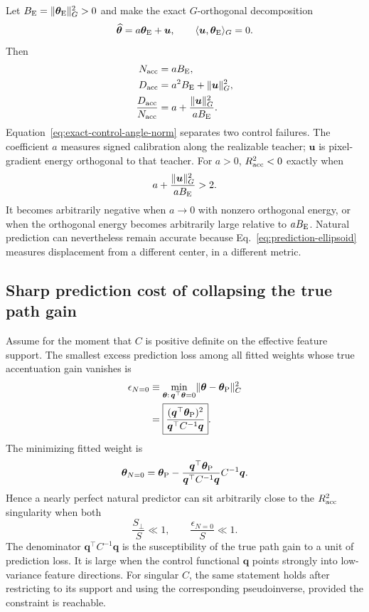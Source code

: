 \documentclass[11pt]{article}
\newcommand{\that}{\widehat{\bm\theta}}
\begin{document}
Let $B_{\rm E}=\lVert\bm\theta_{\rm E}\rVert_G^2>0$ and make the exact
$G$-orthogonal decomposition
\begin{equation}
  \that=a\bm\theta_{\rm E}+\bm u,
  \qquad
  \langle\bm u,\bm\theta_{\rm E}\rangle_G=0.
\end{equation}
Then
\begin{align}
  N_{\rm acc}&=aB_{\rm E},\\
  D_{\rm acc}&=a^2B_{\rm E}+\lVert\bm u\rVert_G^2,\\
  \frac{D_{\rm acc}}{N_{\rm acc}}
    &=a+\frac{\lVert\bm u\rVert_G^2}{aB_{\rm E}}.
  \label{eq:exact-control-angle-norm}
\end{align}
Equation~\eqref{eq:exact-control-angle-norm} separates two control failures.
The coefficient $a$ measures signed calibration along the realizable teacher;
$\bm u$ is pixel-gradient energy orthogonal to that teacher.  For $a>0$,
$R^2_{\rm acc}<0$ exactly when
\begin{equation}
  a+\frac{\lVert\bm u\rVert_G^2}{aB_{\rm E}}>2.
\end{equation}
It becomes arbitrarily negative when $a\to0$ with nonzero orthogonal energy,
or when the orthogonal energy becomes arbitrarily large relative to
$aB_{\rm E}$.  Natural prediction can nevertheless remain accurate because
Eq.~\eqref{eq:prediction-ellipsoid} measures displacement from a different
center, in a different metric.

\subsection{Sharp prediction cost of collapsing the true path gain}

Assume for the moment that $C$ is positive definite on the effective feature
support.  The smallest excess prediction loss among all fitted weights whose
true accentuation gain vanishes is
\begin{align}
  \epsilon_{N=0}
  &\equiv
  \min_{\bm\theta:\,\bm q^{\top}\bm\theta=0}
       \lVert\bm\theta-\bm\theta_{\rm P}\rVert_C^2\nonumber\\
  &=\boxed{
    \frac{(\bm q^{\top}\bm\theta_{\rm P})^2}
         {\bm q^{\top}C^{-1}\bm q}}.
  \label{eq:minimum-risk-to-zero-gain}
\end{align}
The minimizing fitted weight is
\begin{equation}
  \bm\theta_{N=0}
  =\bm\theta_{\rm P}
   -\frac{\bm q^{\top}\bm\theta_{\rm P}}
          {\bm q^{\top}C^{-1}\bm q}C^{-1}\bm q.
\end{equation}
Hence a nearly perfect natural predictor can sit arbitrarily close to the
$R^2_{\rm acc}$ singularity when both
\begin{equation}
  \frac{S_{\perp}}{S}\ll1,
  \qquad
  \frac{\epsilon_{N=0}}{S}\ll1.
  \label{eq:protected-prediction-singular-control}
\end{equation}
The denominator $\bm q^{\top}C^{-1}\bm q$ is the susceptibility of the true
path gain to a unit of prediction loss.  It is large when the control
functional $\bm q$ points strongly into low-variance feature directions.  For
singular $C$, the same statement holds after restricting to its support and
using the corresponding pseudoinverse, provided the constraint is reachable.
\end{document}
